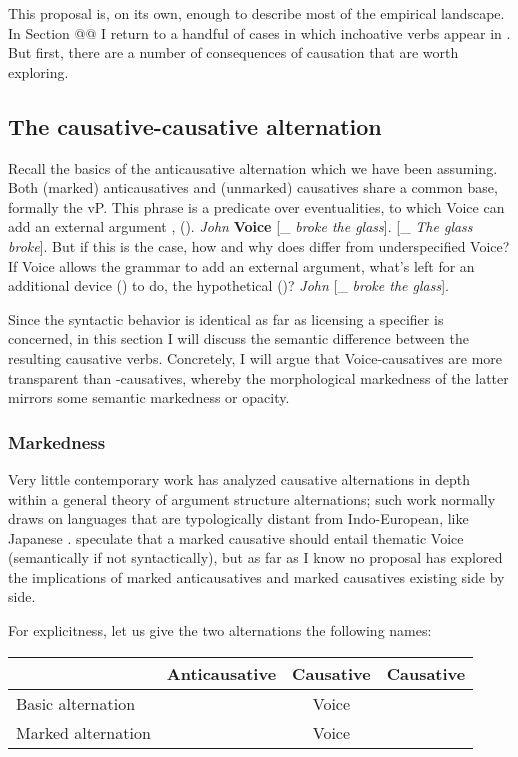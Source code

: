 This proposal is, on its own, enough to describe most of the empirical landscape. In Section @@ I return to a handful of cases in which inchoative verbs appear in {\thif}. But first, there are a number of consequences of causation that are worth exploring.

	\subsection{The causative-causative alternation}
Recall the basics of the anticausative alternation which we have been assuming. Both (marked) anticausatives and (unmarked) causatives share a common base, formally the vP. This phrase is a predicate over eventualities, to which Voice can add an external argument \citep{schaefer08,layering15}, (\nextx).
\pex 
	\a \emph{John} \textbf{Voice} [_{} \emph{broke the glass}].
	\a \textbf{\vz} [_{} \emph{The glass broke}].
\xe
But if this is the case, how and why does {\vd} differ from underspecified Voice? If Voice allows the grammar to add an external argument, what's left for an additional device (\vd) to do, the hypothetical (\nextx)?
\ex \emph{John} \textbf{\vd} [_{} \emph{broke the glass}].
\xe

Since the syntactic behavior is identical as far as licensing a specifier is concerned, in this section I will discuss the semantic difference between the resulting causative verbs. Concretely, I will argue that Voice-causatives are more transparent than {\vd}-causatives, whereby the morphological markedness of the latter mirrors some semantic markedness or opacity.

		\subsubsection{Markedness}
Very little contemporary work has analyzed causative alternations in depth within a general theory of argument structure alternations; such work normally draws on languages that are typologically distant from Indo-European, like Japanese \citep{jacobsen92}. \citet[62f3]{layering15} speculate that a marked causative should entail thematic Voice (semantically if not syntactically), but as far as I know no proposal has explored the implications of marked anticausatives and marked causatives existing side by side.

For explicitness, let us give the two alternations the following names:
\ex
\begin{tabular}{l|ccc}
	&	Anticausative & Causative & Causative\\\hline
Basic alternation	& {\vz} & Voice &   \\
Marked alternation		&		&  Voice & {\vd}\\
\end{tabular}
\xe

